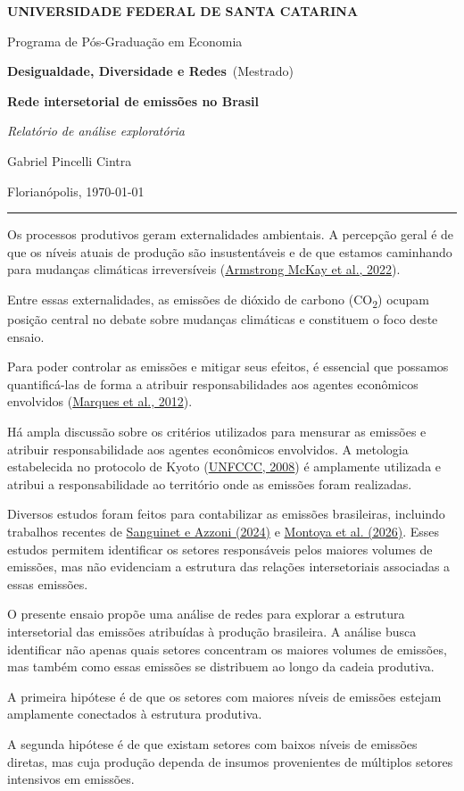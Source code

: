 \documentclass[12pt]{article}
\newcommand{\instituicao}{UNIVERSIDADE FEDERAL DE SANTA CATARINA}
\newcommand{\departamento}{Programa de Pós-Graduação em Economia}
\newcommand{\curso}{Mestrado}
\newcommand{\disciplina}{Desigualdade, Diversidade e Redes}
\newcommand{\titulo}{Rede intersetorial de emissões no Brasil}
\newcommand{\subtitulo}{Relatório de análise exploratória}
\newcommand{\autor}{Gabriel Pincelli Cintra}
\newcommand{\local}{Florianópolis}
\newcommand{\dataentrega}{\today}
\newcommand{\imprimirtitulodois}{
\begin{center}
  {\Large\bfseries\MakeUppercase{\instituicao}\par}
  \vspace{0.2em}
  {\large \departamento\par}
  \vspace{0.2em}
  {\normalsize\textbf{\disciplina}\ (\curso)\par}
  \vspace{1.4em}
  {\LARGE\bfseries \titulo\par}
  \vspace{0.25em}
  {\large\itshape \subtitulo\par}
  \vspace{1.5em}
\end{center}
\noindent
\begin{minipage}{0.48\textwidth}
  \raggedright\normalsize \autor
\end{minipage}\hfill
\begin{minipage}{0.48\textwidth}
  \raggedleft\normalsize \local, \dataentrega
\end{minipage}
\vspace{1.0em}
\hrule
\vspace{1.0em}
}
\begin{document}
\imprimirtitulodois
Os processos produtivos geram externalidades ambientais. A percepção geral é de que os níveis atuais de produção são insustentáveis e de que estamos caminhando para mudanças climáticas irreversíveis (\href{https://doi.org/10.1126/science.abn7950}{Armstrong McKay et al., 2022}).

Entre essas externalidades, as emissões de dióxido de carbono (CO\textsubscript{2}) ocupam posição central no debate sobre mudanças climáticas e constituem o foco deste ensaio.

Para poder controlar as emissões e mitigar seus efeitos, é essencial que possamos quantificá-las de forma a atribuir responsabilidades aos agentes econômicos envolvidos (\href{https://doi.org/10.1016/j.ecolecon.2012.09.010}{Marques et al., 2012}).

Há ampla discussão sobre os critérios utilizados para mensurar as emissões e atribuir responsabilidade aos agentes econômicos envolvidos. A metologia estabelecida no protocolo de Kyoto (\href{https://unfccc.int/resource/docs/publications/08_unfccc_kp_ref_manual.pdf}{UNFCCC, 2008}) é amplamente utilizada e atribui a responsabilidade ao território onde as emissões foram realizadas.

Diversos estudos foram feitos para contabilizar as emissões brasileiras, incluindo trabalhos recentes de \href{https://doi.org/10.1016/j.rspp.2024.100015}{Sanguinet e Azzoni (2024)} e \href{https://doi.org/10.1007/s10668-024-05251-8}{Montoya et al. (2026)}. Esses estudos permitem identificar os setores responsáveis pelos maiores volumes de emissões, mas não evidenciam a estrutura das relações intersetoriais associadas a essas emissões.

O presente ensaio propõe uma análise de redes para explorar a estrutura intersetorial das emissões atribuídas à produção brasileira. A análise busca identificar não apenas quais setores concentram os maiores volumes de emissões, mas também como essas emissões se distribuem ao longo da cadeia produtiva.

A primeira hipótese é de que os setores com maiores níveis de emissões estejam amplamente conectados à estrutura produtiva.

A segunda hipótese é de que existam setores com baixos níveis de emissões diretas, mas cuja produção dependa de insumos provenientes de múltiplos setores intensivos em emissões.
\end{document}
